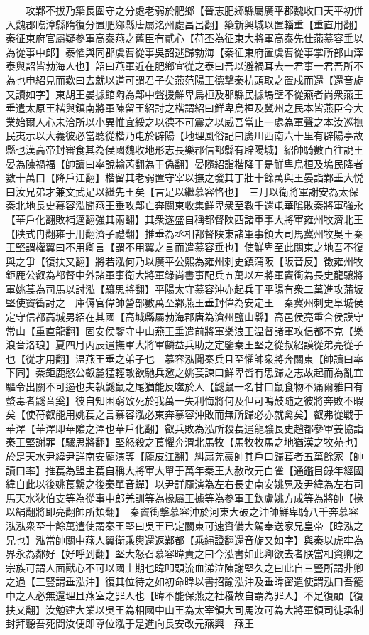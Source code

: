 　　攻鄴不拔乃築長圍守之分處老弱於肥鄉【晉志肥郷縣屬廣平郡魏收曰天平初併入魏郡臨漳縣隋復分置肥鄉縣唐屬洺州處昌呂翻】築新興城以置輜重【重直用翻】　秦征東府官屬疑參軍高泰燕之舊臣有貳心【苻丕為征東大將軍高泰先仕燕慕容垂以為從事中郎】泰懼與同郡虞曹從事吳韶逃歸勃海【秦征東府置虞曹從事掌所部山澤泰與韶皆勃海人也】韶曰燕軍近在肥鄉宜從之泰曰吾以避禍耳去一君事一君吾所不為也申紹見而歎曰去就以道可謂君子矣燕范陽王德撃秦枋頭取之置戍而還【還音旋又讀如字】東胡王晏據館陶為鄴中聲援鮮卑烏桓及郡縣民據塢壁不從燕者尚衆燕王垂遣太原王楷與鎮南將軍陳留王紹討之楷謂紹曰鮮卑烏桓及冀州之民本皆燕臣今大業始爾人心未洽所以小異惟宜綏之以德不可震之以威吾當止一處為軍聲之本汝巡撫民夷示以大義彼必當聽從楷乃屯於辟陽【地理風俗記曰廣川西南六十里有辟陽亭故縣也漢高帝封審食其為侯國魏收地形志長樂郡信都縣有辟陽城】紹帥騎數百往說王晏為陳禍福【帥讀曰率說輸芮翻為于偽翻】晏隨紹詣楷降于是鮮卑烏桓及塢民降者數十萬口【降戶江翻】楷留其老弱置守宰以撫之發其丁壯十餘萬與王晏詣鄴垂大悦曰汝兄弟才兼文武足以繼先王矣【言足以繼慕容恪也】　三月以衛將軍謝安為太保　秦北地長史慕容泓聞燕王垂攻鄴亡奔關東收集鮮卑衆至數千還屯華隂敗秦將軍強永【華戶化翻敗補邁翻強其兩翻】其衆遂盛自稱都督陕西諸軍事大將軍雍州牧濟北王【陕式冉翻雍于用翻濟子禮翻】推垂為丞相都督陕東諸軍事領大司馬冀州牧吳王秦王堅謂權翼曰不用卿言【謂不用翼之言而遣慕容垂也】使鮮卑至此關東之地吾不復與之爭【復扶又翻】將若泓何乃以廣平公熙為雍州刺史鎮蒲阪【阪音反】徵雍州牧鉅鹿公叡為都督中外諸軍事衛大將軍錄尚書事配兵五萬以左將軍竇衝為長史龍驤將軍姚萇為司馬以討泓【驤思將翻】平陽太守慕容沖亦起兵于平陽有衆二萬進攻蒲坂堅使竇衝討之　庫傉官偉帥營部數萬至鄴燕王垂封偉為安定王　秦冀州刺史阜城侯定守信都高城男紹在其國【高城縣屬勃海郡唐為滄州鹽山縣】高邑侯亮重合侯謨守常山【重直龍翻】固安侯鑒守中山燕王垂遣前將軍樂浪王温督諸軍攻信都不克【樂浪音洛琅】夏四月丙辰遣撫軍大將軍麟益兵助之定鑒秦王堅之從叔紹謨從弟亮從子也【從才用翻】温燕王垂之弟子也　慕容泓聞秦兵且至懼帥衆將奔關東【帥讀曰率下同】秦鉅鹿愍公叡麄猛輕敵欲馳兵邀之姚萇諫曰鮮卑皆有思歸之志故起而為亂宜驅令出關不可遏也夫執鼷鼠之尾猶能反噬於人【鼷鼠一名甘口鼠食物不痛爾雅曰有螫毒者鼷音奚】彼自知困窮致死於我萬一失利悔將何及但可鳴鼓随之彼將奔敗不暇矣【使苻叡能用姚萇之言慕容泓必東奔慕容沖敗而無所歸必亦就禽矣】叡弗從戰于華澤【華澤即華隂之澤也華戶化翻】叡兵敗為泓所殺萇遣龍驤長史趙都參軍姜協詣秦王堅謝罪【驤思將翻】堅怒殺之萇懼奔渭北馬牧【馬牧牧馬之地猶漢之牧苑也】於是天水尹緯尹詳南安龎演等【龎皮江翻】糾扇羌豪帥其戶口歸萇者五萬餘家【帥讀曰率】推萇為盟主萇自稱大將軍大單于萬年秦王大赦改元白雀【通鑑目錄年經國緯自此以後姚萇繋之後秦單音蟬】以尹詳龎演為左右長史南安姚晃及尹緯為左右司馬天水狄伯支等為從事中郎羌訓等為掾屬王據等為參軍王欽盧姚方成等為將帥【掾以絹翻將即亮翻帥所類翻】　秦竇衝撃慕容沖於河東大破之沖帥鮮卑騎八千奔慕容泓泓衆至十餘萬遣使謂秦王堅曰吳王已定關東可速資備大駕奉送家兄皇帝【暐泓之兄也】泓當帥關中燕人翼衛乘輿還返鄴都【乘䋲證翻還音旋又如字】與秦以虎牢為界永為鄰好【好呼到翻】堅大怒召慕容暐責之曰今泓書如此卿欲去者朕當相資卿之宗族可謂人面獸心不可以國士期也暐叩頭流血涕泣陳謝堅久之曰此自三豎所謂非卿之過【三豎謂垂泓沖】復其位待之如初命暐以書招諭泓沖及垂暐密遣使謂泓曰吾籠中之人必無還理且燕室之罪人也【暐不能保燕之社稷故自謂為罪人】不足復顧【復扶又翻】汝勉建大業以吳王為相國中山王為太宰領大司馬汝可為大將軍領司徒承制封拜聽吾死問汝便即尊位泓于是進向長安改元燕興　燕王